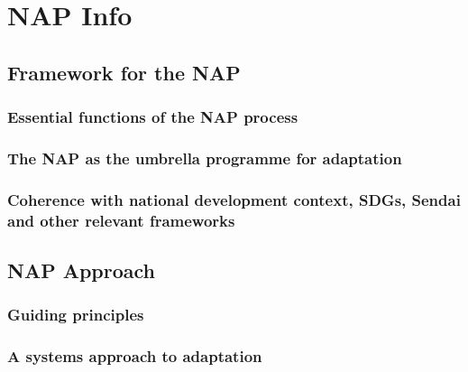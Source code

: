 \documentclass[
]{book}
\begin{document}
\hypertarget{nap-info}{%
\chapter{NAP Info}\label{nap-info}}

\hypertarget{framework-for-the-nap}{%
\section{Framework for the NAP}\label{framework-for-the-nap}}

\hypertarget{essential-functions-of-the-nap-process}{%
\subsection{Essential functions of the NAP process}\label{essential-functions-of-the-nap-process}}

\hypertarget{the-nap-as-the-umbrella-programme-for-adaptation}{%
\subsection{The NAP as the umbrella programme for adaptation}\label{the-nap-as-the-umbrella-programme-for-adaptation}}

\hypertarget{coherence-with-national-development-context-sdgs-sendai-and-other-relevant-frameworks}{%
\subsection{Coherence with national development context, SDGs, Sendai and other relevant frameworks}\label{coherence-with-national-development-context-sdgs-sendai-and-other-relevant-frameworks}}

\hypertarget{nap-approach}{%
\section{NAP Approach}\label{nap-approach}}

\hypertarget{guiding-principles}{%
\subsection{Guiding principles}\label{guiding-principles}}

\hypertarget{a-systems-approach-to-adaptation}{%
\subsection{A systems approach to adaptation}\label{a-systems-approach-to-adaptation}}
\end{document}
